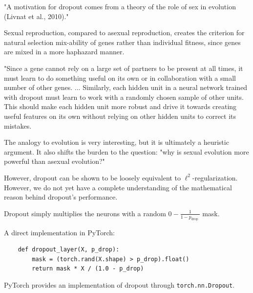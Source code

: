 \documentclass{report}
\begin{document}
\begin{concept}
    "A motivation for dropout comes from a theory of the role of sex in evolution (Livnat et al., 2010)."

    Sexual reproduction, compared to asexual reproduction, creates the criterion for natural selection mix-ability of genes rather than individual fitness, since genes are mixed in a more haphazard manner.

    "Since a gene cannot rely on a large set of partners to be present at all times, it must learn to do something useful on its own or in collaboration with a small number of other genes. ... Similarly, each hidden unit in a neural network trained with dropout must learn to work with a randomly chosen sample of other units. This should make each hidden unit more robust and drive it towards creating useful features on its own without relying on other hidden units to correct its mistakes.

    The analogy to evolution is very interesting, but it is ultimately a heuristic argument. It also shifts the burden to the question: "why is sexual evolution more powerful than asexual evolution?"

    However, dropout can be shown to be loosely equivalent to $\ell^{2}$-regularization. However, we do not yet have a complete understanding of the mathematical reason behind dropout's performance.
\end{concept}

\begin{concept}
    Dropout simply multiplies the neurons with a random $0-\frac{1}{1-p_{\text {drop }}}$ mask.

    A direct implementation in PyTorch:

    \begin{verbatim}
    def dropout_layer(X, p_drop):
        mask = (torch.rand(X.shape) > p_drop).float()
        return mask * X / (1.0 - p_drop)
    \end{verbatim}

    PyTorch provides an implementation of dropout through \verb|torch.nn.Dropout|.
\end{concept}
\end{document}
